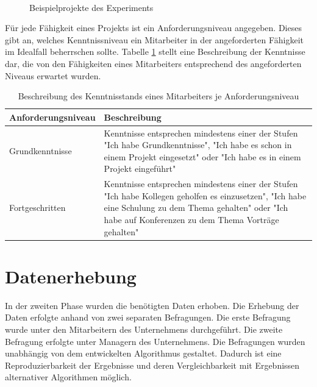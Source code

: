 \begin{figure}
    \\
\caption[Beispielprojekte des Experiments]{Beispielprojekte des Experiments}
  \label{fig:methodik:abb2}
\end{figure}

Für jede Fähigkeit eines Projekts ist ein Anforderungsniveau angegeben.
Dieses gibt an, welches Kenntnissniveau ein Mitarbeiter in der angeforderten Fähigkeit im Idealfall beherrschen sollte.
Tabelle \ref{tab:methodik:tab1} stellt eine Beschreibung der Kenntnisse dar, die von den Fähigkeiten eines Mitarbeiters entsprechend des angeforderten Niveaus erwartet wurden.

\begin{table}[htbp]
    \begin{center}
    \begin{tabular}{p{1.5in}|p{3.25in}}
    {\textbf{Anforderungsniveau}} & {\textbf{Beschreibung}}\\
    \hline
	Grundkenntnisse & Kenntnisse entsprechen mindestens einer der Stufen "Ich habe Grundkenntnisse", "Ich habe es schon in einem Projekt eingesetzt" oder "Ich habe es in einem Projekt eingeführt" \\
    \hline
    Fortgeschritten & Kenntnisse entsprechen mindestens einer der Stufen "Ich habe Kollegen geholfen es einzusetzen", "Ich habe eine Schulung zu dem Thema gehalten" oder "Ich habe auf Konferenzen zu dem Thema Vorträge gehalten" \\
    \end{tabular}
    \end{center}
    \caption[Beschreibung des Kenntnisstands eines Mitarbeiters je Anforderungsniveau]{Beschreibung des Kenntnisstands eines Mitarbeiters je Anforderungsniveau}
	\label{tab:methodik:tab1}
\end{table}

\section{Datenerhebung}
\label{ch:methodik:datenerhebung}
In der zweiten Phase wurden die benötigten Daten erhoben.
Die Erhebung der Daten erfolgte anhand von zwei separaten Befragungen.
Die erste Befragung wurde unter den Mitarbeitern des Unternehmens durchgeführt.
Die zweite Befragung erfolgte unter Managern des Unternehmens.
Die Befragungen wurden unabhängig von dem entwickelten Algorithmus gestaltet.
Dadurch ist eine Reproduzierbarkeit der Ergebnisse und deren Vergleichbarkeit mit Ergebnissen alternativer Algorithmen möglich.

